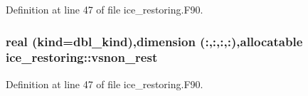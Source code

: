 Definition at line 47 of file ice\_\-restoring.F90.\hypertarget{namespaceice__restoring_a631c5dd66d9dbbad28240813763f7acf}{
\subsubsection[{vsnon\_\-rest}]{\setlength{\rightskip}{0pt plus 5cm}real (kind=dbl\_\-kind),dimension (:,:,:,:),allocatable {\bf ice\_\-restoring::vsnon\_\-rest}}}
\label{namespaceice__restoring_a631c5dd66d9dbbad28240813763f7acf}


Definition at line 47 of file ice\_\-restoring.F90.